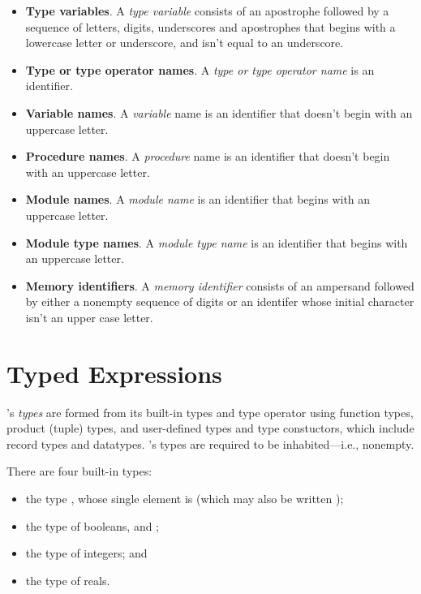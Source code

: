 \begin{itemize}
\item \textbf{Type variables}. A \emph{type variable} consists of an
  apostrophe followed by a sequence of letters, digits, underscores
  and apostrophes that begins with a lowercase letter or underscore,
  and isn't equal to an underscore.

\item \textbf{Type or type operator names}. A \emph{type or type
  operator name} is an identifier.

\item \textbf{Variable names}. A \emph{variable} name is an identifier
  that doesn't begin with an uppercase letter.

\item \textbf{Procedure names}. A \emph{procedure} name is an identifier
  that doesn't begin with an uppercase letter.

\item \textbf{Module names}. A \emph{module name} is an identifier that
  begins with an uppercase letter.

\item \textbf{Module type names}. A \emph{module type name} is an
  identifier that begins with an uppercase letter.

\item \textbf{Memory identifiers}. A \emph{memory identifier} consists
of an ampersand followed by either a nonempty sequence of digits or
an identifer whose initial character isn't an upper case letter.

\end{itemize}

\section{Typed Expressions}

\EasyCrypt's \emph{types} are formed from its built-in types and
type operator using function types, product (tuple) types, and
user-defined types and type constuctors, which include record types
and datatypes. \EasyCrypt's types are required to be inhabited---i.e.,
nonempty.

There are four built-in types:
\begin{itemize}
\item the type , whose single element is  (which may
  also be written \ec{()});

\item the type  of booleans,  and ;

\item the type  of integers; and

\item the type  of reals.
\end{itemize}

